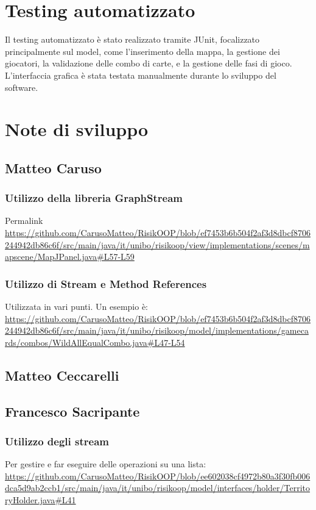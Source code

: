 \documentclass[a4paper,12pt]{report}
\begin{document}
\section{Testing automatizzato}
Il testing automatizzato è stato realizzato tramite JUnit, focalizzato principalmente sul model, come l'inserimento della mappa, la gestione dei giocatori, la validazione delle combo di carte, e la gestione delle fasi di gioco.
L'interfaccia grafica è stata testata manualmente durante lo sviluppo del software.

\section{Note di sviluppo}
\subsection{Matteo Caruso}
\subsubsection{Utilizzo della libreria GraphStream}
Permalink \url{https://github.com/CarusoMatteo/RisikOOP/blob/ef7453b6b504f2af3d8dbcf8706244942db86c6f/src/main/java/it/unibo/risikoop/view/implementations/scenes/mapscene/MapJPanel.java#L57-L59}
\subsubsection{Utilizzo di Stream e Method References}
Utilizzata in vari punti. Un esempio è: \url{https://github.com/CarusoMatteo/RisikOOP/blob/ef7453b6b504f2af3d8dbcf8706244942db86c6f/src/main/java/it/unibo/risikoop/model/implementations/gamecards/combos/WildAllEqualCombo.java#L47-L54}

\subsection{Matteo Ceccarelli}

\subsection{Francesco Sacripante}
\subsubsection{Utilizzo degli stream}
Per gestire e far eseguire delle operazioni su una lista: \url{https://github.com/CarusoMatteo/RisikOOP/blob/ee602038cf4972b80a3f30fb006dca5d9ab2ccb1/src/main/java/it/unibo/risikoop/model/interfaces/holder/TerritoryHolder.java#L41}
\end{document}
